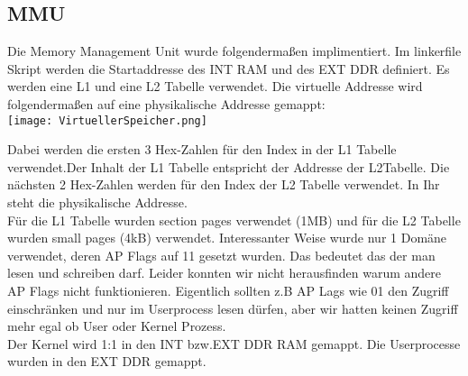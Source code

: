 \subsection{MMU}
	Die Memory Management Unit wurde folgendermaßen implimentiert. Im linkerfile Skript werden die Startaddresse des INT RAM und des EXT DDR definiert. Es werden eine L1 und eine L2 Tabelle verwendet. Die virtuelle Addresse wird folgendermaßen auf eine physikalische Addresse gemappt:\\
\texttt{[image: VirtuellerSpeicher.png]} 

Dabei werden die ersten 3 Hex-Zahlen für den Index in der L1 Tabelle verwendet.Der Inhalt der L1 Tabelle entspricht der Addresse der L2Tabelle. Die nächsten 2 Hex-Zahlen werden für den Index der L2 Tabelle verwendet. In Ihr steht die physikalische Addresse.\\
Für die L1 Tabelle wurden section pages verwendet (1MB) und für die L2 Tabelle wurden small pages (4kB) verwendet.
Interessanter Weise wurde nur 1 Domäne verwendet, deren AP Flags auf 11 gesetzt wurden. Das bedeutet das der man lesen und schreiben darf. Leider konnten wir nicht herausfinden warum andere AP Flags nicht funktionieren. Eigentlich sollten z.B AP Lags wie 01 den Zugriff einschränken und nur im Userprocess lesen dürfen, aber wir hatten keinen Zugriff mehr egal ob User oder Kernel Prozess.\\

Der Kernel wird 1:1 in den INT bzw.EXT DDR RAM gemappt. Die Userprocesse wurden in den EXT DDR gemappt.
\newpage
